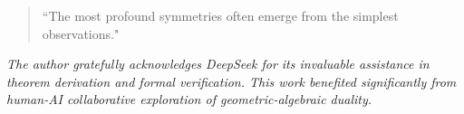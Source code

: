\documentclass{article}
\begin{document}
\begin{quote}
``The most profound symmetries often emerge from the simplest observations."
\end{quote}

\vspace{0.5em}
\noindent
\textit{The author gratefully acknowledges DeepSeek for its invaluable assistance in theorem derivation and formal verification. This work benefited significantly from human-AI collaborative exploration of geometric-algebraic duality.}


\end{document}

